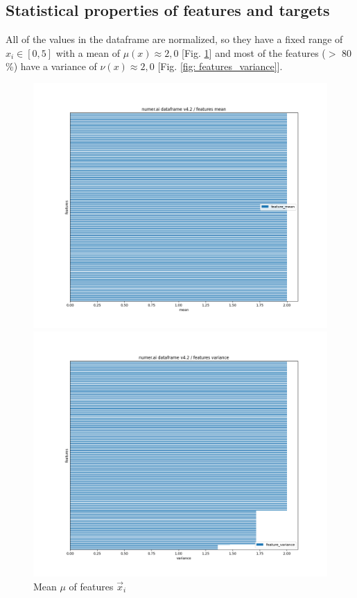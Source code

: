\documentclass[12pt, a4paper]{article}
\begin{document}
\subsection{Statistical properties of features and targets}
All of the values in the dataframe are normalized, so they have a fixed range of $x_i \in [0,5]$ with a mean of $\mu(x) \approx 2,0$ [Fig. \ref{fig: features_mean}] and most of the features ($>$ 80 \%) have a variance of $\nu(x) \approx 2,0$ [Fig. \ref{fig: features_variance}].
\begin{figure}[htbp]
\begin{minipage}[t]{7cm}
\vspace{0pt}
\centering
\includegraphics[width=1\textwidth,trim={0 0 0 0},clip]{figures/train_df_features_mean_horizontal_barplot_2023-09-30.png}
\caption[Mean of Features]{Mean $\mu$ of features $\vec{x}_i$} 
\label{fig: features_mean}  
\end{minipage}
\hfill
\begin{minipage}[t]{7cm}
\vspace{0pt}
\centering
\includegraphics[width=1\textwidth,trim={0 0 0 0},clip]{figures/train_df_features_variance_horizontal_barplot_2023-09-30.png}

\end{minipage}
\end{figure}
\end{document}
